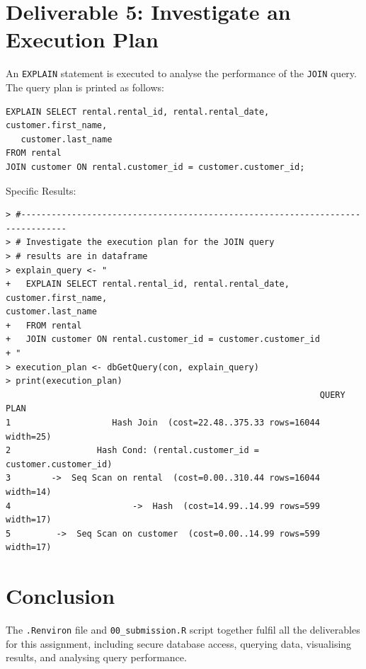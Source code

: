 \documentclass[a4paper,11pt]{extarticle}
\begin{document}
\newpage
\section*{Deliverable 5: Investigate an Execution Plan}
An \texttt{EXPLAIN} statement is executed to analyse the performance of the \texttt{JOIN} query. The query plan is printed as follows:
\begin{verbatim}
EXPLAIN SELECT rental.rental_id, rental.rental_date, customer.first_name, 
   customer.last_name
FROM rental
JOIN customer ON rental.customer_id = customer.customer_id;
\end{verbatim}
Specific Results:
\begin{verbatim}
> #-------------------------------------------------------------------------------
> # Investigate the execution plan for the JOIN query
> # results are in dataframe 
> explain_query <- "
+   EXPLAIN SELECT rental.rental_id, rental.rental_date, customer.first_name, 
customer.last_name 
+   FROM rental
+   JOIN customer ON rental.customer_id = customer.customer_id
+ "
> execution_plan <- dbGetQuery(con, explain_query)
> print(execution_plan)
                                                              QUERY PLAN
1                    Hash Join  (cost=22.48..375.33 rows=16044 width=25)
2                 Hash Cond: (rental.customer_id = customer.customer_id)
3        ->  Seq Scan on rental  (cost=0.00..310.44 rows=16044 width=14)
4                        ->  Hash  (cost=14.99..14.99 rows=599 width=17)
5         ->  Seq Scan on customer  (cost=0.00..14.99 rows=599 width=17)
\end{verbatim}
\section*{Conclusion}
The \texttt{.Renviron} file and \texttt{00\_submission.R} script together fulfil all the deliverables for this assignment, including secure database access, querying data, visualising results, and analysing query performance.
\end{document}
